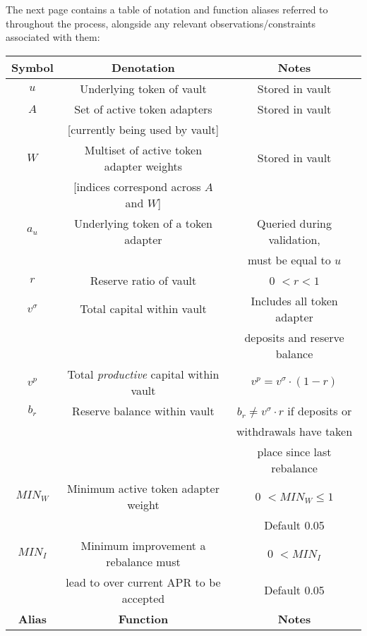 \documentclass{article}
\begin{document}
\noindent
The next page contains a table of notation and function aliases referred to throughout the process, alongside any relevant observations/constraints associated with them:

\begin{table}[]
    \centering
    \begin{tabular}{|c|c|c|}
        \hline
        \textbf{Symbol} & \textbf{Denotation} & \textbf{Notes}\\
        \hline
        \hline
        $u$ & Underlying token of vault & Stored in vault\\
        \hline
        $A$ & Set of active token adapters & Stored in vault\\
            & [currently being used by vault] & \\
        \hline
        $W$ & Multiset of active token adapter weights & Stored in vault\\
         & [indices correspond across $A$ and $W$] & \\
        \hline
        $a_{u}$ & Underlying token of a token adapter & Queried during validation, \\
        & & must be equal to $u$ \\
        \hline
        $r$ & Reserve ratio of vault & 0 $< r < 1$\\
        \hline
        $v^{\sigma}$ & Total capital within vault & Includes all token adapter \\
        &  & deposits and reserve balance \\
        \hline
        $v^{p}$ & Total \textit{productive} capital within vault & $v^{p} = v^{\sigma} \cdot (1 - r)$\\
        \hline
        $b_{r}$ & Reserve balance within vault & $b_{r} \neq v^{\sigma} \cdot r$ if deposits or\\
        & & withdrawals have taken\\
        & & place since last rebalance\\
        \hline
        $MIN_W$ & Minimum active token adapter weight & 0 $< MIN_W \leq 1$\\
        & & Default 0.05\\
        \hline
        $MIN_I$ & Minimum improvement a rebalance must & 0 $< MIN_I$ \\
         & lead to over current APR to be accepted & Default 0.05 \\
        \hline
        \hline
        \textbf{Alias} & \textbf{Function} & \textbf{Notes} \\

\end{tabular}
\end{table}
\end{document}
